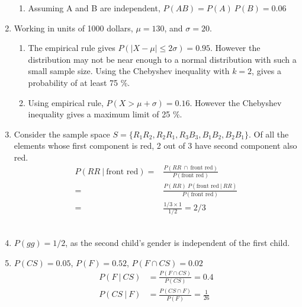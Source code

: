 \begin{enumerate}
\begin{enumerate}
		\item Assuming A and B are independent, $ P(AB) = P(A)\ P(B) = 0.06$ \\
	\end{enumerate}
	
	\item Working in units of 1000 dollars, $ \mu = 130 $, and $ \sigma = 20 $. 
	\begin{enumerate}
		\item The empirical rule gives $ P(|X - \mu| \leq 2 \sigma) =  0.95$. However the distribution may not be near enough to a normal distribution with such a small sample size. Using the Chebyshev inequality with $ k = 2 $, gives a probability of at least 75 \%. \\
		
		\item Using empirical rule, $ P(X > \mu + \sigma) = 0.16 $. However the Chebyshev inequality gives a maximum limit of 25 \%.\\
	\end{enumerate} 
	
	\item Consider the sample space $S = \{ R_1 R_2, R_2 R_1, R_3 B_3, B_1 B_2, B_2 B_1 \} $. Of all the elements whose first component is red, 2 out of 3 have second component also red. \\
	
		\begin{align}
			P(RR\ |\ \text{front red}) =& \frac{P(RR \ \cap \  \text{front red})}{P(\text{front red})} \\
			=& \frac{P(RR) \ P(\text{front red}\ |\ RR)}{P(\text{front red})} \\
			=& \frac{1/3 \times 1}{1/2} = 2/3
		\end{align}
	 \\
	
	\item $ P(gg) = 1/2 $, as the second child's gender is independent of the first child. \\
	
	\item $ P(CS) = 0.05 $, $ P(F) = 0.52 $, $ P(F \cap CS) = 0.02 $ \\
	
		\begin{align}
			P(F\ |\ CS) &= \frac{P(F \cap CS)}{P(CS)} = 0.4 \\
			P(CS\ |\ F) &= \frac{P(CS \cap F)}{P(F)} = \frac{1}{26}
		\end{align}
	

\end{enumerate}
